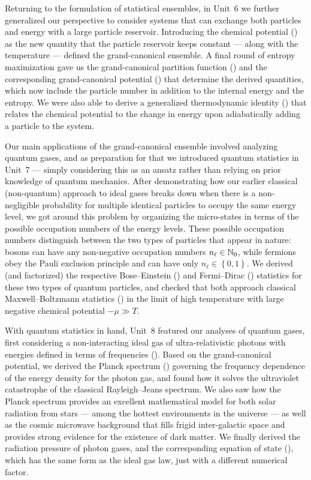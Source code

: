 Returning to the formulation of statistical ensembles, in Unit~6 we further generalized our perspective to consider systems that can exchange both particles and energy with a large particle reservoir.
Introducing the chemical potential () as the new quantity that the particle reservoir keeps constant --- along with the temperature --- defined the grand-canonical ensemble.
A final round of entropy maximization gave us the grand-canonical partition function () and the corresponding grand-canonical potential () that determine the derived quantities, which now include the particle number in addition to the internal energy and the entropy.
We were also able to derive a generalized thermodynamic identity () that relates the chemical potential to the change in energy upon adiabatically adding a particle to the system.

Our main applications of the grand-canonical ensemble involved analyzing quantum gases, and as preparation for that we introduced quantum statistics in Unit~7 --- simply considering this as an ansatz rather than relying on prior knowledge of quantum mechanics.
After demonstrating how our earlier classical (non-quantum) approach to ideal gases breaks down when there is a non-negligible probability for multiple identical particles to occupy the same energy level, we got around this problem by organizing the micro-states in terms of the possible occupation numbers of the energy levels.
These possible occupation numbers distinguish between the two types of particles that appear in nature: bosons can have any non-negative occupation numbers $n_{\ell} \in \mathbb N_0$, while fermions obey the Pauli exclusion principle and can have only $n_{\ell} \in \left\{0, 1\right\}$.
We derived (and factorized) the respective Bose--Einstein () and Fermi--Dirac () statistics for these two types of quantum particles, and checked that both approach classical Maxwell--Boltzmann statistics () in the limit of high temperature with large negative chemical potential $-\mu \gg T$.

With quantum statistics in hand, Unit~8 featured our analyses of quantum gases, first considering a non-interacting ideal gas of ultra-relativistic photons with energies defined in terms of frequencies ().
Based on the grand-canonical potential, we derived the Planck spectrum () governing the frequency dependence of the energy density for the photon gas, and found how it solves the ultraviolet catastrophe of the classical Rayleigh--Jeans spectrum.
We also saw how the Planck spectrum provides an excellent mathematical model for both solar radiation from stars --- among the hottest environments in the universe --- as well as the cosmic microwave background that fills frigid inter-galactic space and provides strong evidence for the existence of dark matter.
We finally derived the radiation pressure of photon gases, and the corresponding equation of state (), which has the same form as the ideal gas law, just with a different numerical factor.

